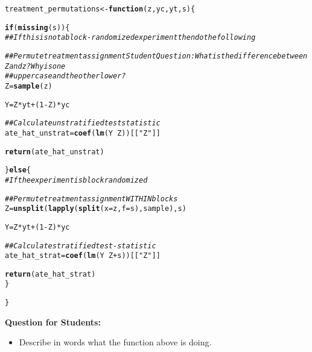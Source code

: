 \documentclass[11pt,leqno]{article}\usepackage[]{graphicx}\usepackage[]{color}
\makeatletter
\newcommand{\hlnum}[1]{\textcolor[rgb]{0.686,0.059,0.569}{#1}}%
\newcommand{\hlstr}[1]{\textcolor[rgb]{0.192,0.494,0.8}{#1}}%
\newcommand{\hlcom}[1]{\textcolor[rgb]{0.678,0.584,0.686}{\textit{#1}}}%
\newcommand{\hlopt}[1]{\textcolor[rgb]{0,0,0}{#1}}%
\newcommand{\hlstd}[1]{\textcolor[rgb]{0.345,0.345,0.345}{#1}}%
\newcommand{\hlkwa}[1]{\textcolor[rgb]{0.161,0.373,0.58}{\textbf{#1}}}%
\newcommand{\hlkwb}[1]{\textcolor[rgb]{0.69,0.353,0.396}{#1}}%
\newcommand{\hlkwc}[1]{\textcolor[rgb]{0.333,0.667,0.333}{#1}}%
\newcommand{\hlkwd}[1]{\textcolor[rgb]{0.737,0.353,0.396}{\textbf{#1}}}%
\newenvironment{kframe}{%
 \def\at@end@of@kframe{}%
 \ifinner\ifhmode%
  \def\at@end@of@kframe{\end{minipage}}%
  \begin{minipage}{\columnwidth}%
 \fi\fi%
 \def\FrameCommand##1{\hskip\@totalleftmargin \hskip-\fboxsep
 \colorbox{shadecolor}{##1}\hskip-\fboxsep
     \hskip-\linewidth \hskip-\@totalleftmargin \hskip\columnwidth}%
 \MakeFramed {\advance\hsize-\width
   \@totalleftmargin\z@ \linewidth\hsize
   \@setminipage}}%
 {\par\unskip\endMakeFramed%
 \at@end@of@kframe}
\newenvironment{knitrout}{}{} %
\theoremstyle{newstyle}
\makeatother
\begin{document}
\begin{knitrout}\footnotesize
{}\color{fgcolor}\begin{kframe}
\begin{alltt}
\hlstd{treatment_permutations} \hlkwb{<-} \hlkwa{function}\hlstd{(}\hlkwc{z}\hlstd{,} \hlkwc{yc}\hlstd{,} \hlkwc{yt}\hlstd{,} \hlkwc{s}\hlstd{) \{}

    \hlkwa{if} \hlstd{(}\hlkwd{missing}\hlstd{(s)) \{}
        \hlcom{## If this is not a block-randomized experiment then do the following}

        \hlcom{## Permute treatment assignment Student Question: What is the difference between Z and z?  Why is one}
        \hlcom{## uppercase and the other lower?}
        \hlstd{Z} \hlkwb{=} \hlkwd{sample}\hlstd{(z)}

        \hlstd{Y} \hlkwb{=} \hlstd{Z} \hlopt{*} \hlstd{yt} \hlopt{+} \hlstd{(}\hlnum{1} \hlopt{-} \hlstd{Z)} \hlopt{*} \hlstd{yc}

        \hlcom{## Calculate unstratified test statistic}
        \hlstd{ate_hat_unstrat} \hlkwb{=} \hlkwd{coef}\hlstd{(}\hlkwd{lm}\hlstd{(Y} \hlopt{~} \hlstd{Z))[[}\hlstr{"Z"}\hlstd{]]}

        \hlkwd{return}\hlstd{(ate_hat_unstrat)}

    \hlstd{\}} \hlkwa{else} \hlstd{\{}
        \hlcom{# If the experiment is block randomized}

        \hlcom{## Permute treatment assignment WITHIN blocks}
        \hlstd{Z} \hlkwb{=} \hlkwd{unsplit}\hlstd{(}\hlkwd{lapply}\hlstd{(}\hlkwd{split}\hlstd{(}\hlkwc{x} \hlstd{= z,} \hlkwc{f} \hlstd{= s), sample), s)}

        \hlstd{Y} \hlkwb{=} \hlstd{Z} \hlopt{*} \hlstd{yt} \hlopt{+} \hlstd{(}\hlnum{1} \hlopt{-} \hlstd{Z)} \hlopt{*} \hlstd{yc}

        \hlcom{## Calculate stratified test-statistic}
        \hlstd{ate_hat_strat} \hlkwb{=} \hlkwd{coef}\hlstd{(}\hlkwd{lm}\hlstd{(Y} \hlopt{~} \hlstd{Z} \hlopt{+} \hlstd{s))[[}\hlstr{"Z"}\hlstd{]]}

        \hlkwd{return}\hlstd{(ate_hat_strat)}
    \hlstd{\}}

\hlstd{\}}
\end{alltt}
\end{kframe}
\end{knitrout}

\vspace{5mm}
\begin{mdframed}
\textbf{Question for Students:}
\vspace{-5mm}
\begin{itemize}\itemsep1pt
\item Describe in words what the function above is doing.
\end{itemize}
\end{mdframed}
\end{document}
